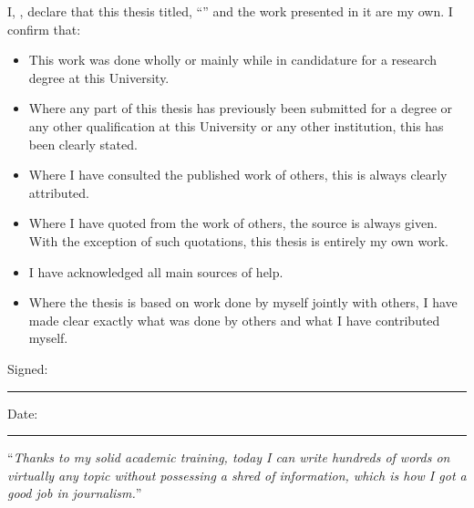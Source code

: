 \documentclass[
11pt, %
oneside, %
english, %
singlespacing, %
headsepline, %
]{MastersDoctoralThesis} %
\theoremstyle{plain}
\theoremstyle{definition}
\theoremstyle{remark}
\theoremstyle{remark}
\theoremstyle{plain}
\theoremstyle{plain}
\begin{document}

\begin{declaration}
\addchaptertocentry{\authorshipname} %
\noindent I, \authorname, declare that this thesis titled, \enquote{\ttitle} and the work presented in it are my own. I confirm that:

\begin{itemize} 
\item This work was done wholly or mainly while in candidature for a research degree at this University.
\item Where any part of this thesis has previously been submitted for a degree or any other qualification at this University or any other institution, this has been clearly stated.
\item Where I have consulted the published work of others, this is always clearly attributed.
\item Where I have quoted from the work of others, the source is always given. With the exception of such quotations, this thesis is entirely my own work.
\item I have acknowledged all main sources of help.
\item Where the thesis is based on work done by myself jointly with others, I have made clear exactly what was done by others and what I have contributed myself.\\
\end{itemize}
 
\noindent Signed:\\
\rule[0.5em]{25em}{0.5pt} %
 
\noindent Date:\\
\rule[0.5em]{25em}{0.5pt} %
\end{declaration}

\cleardoublepage


\vspace*{0.2\textheight}

\noindent\enquote{\itshape Thanks to my solid academic training, today I can write hundreds of words on virtually any topic without possessing a shred of information, which is how I got a good job in journalism.}\bigbreak
\end{document}
